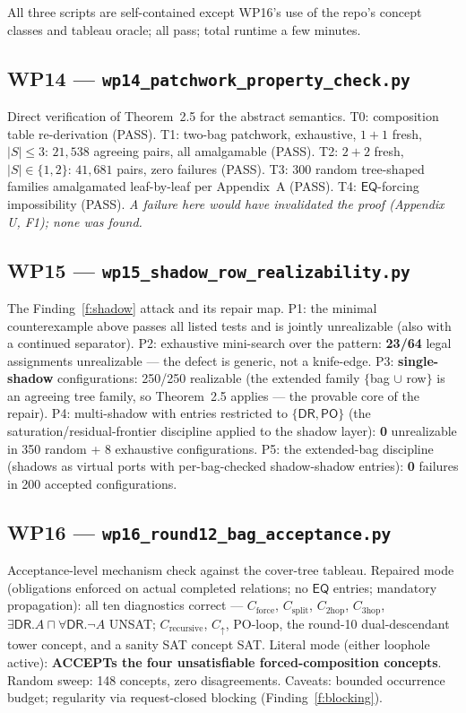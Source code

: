 \documentclass[11pt]{article}
\theoremstyle{definition}
\newcommand{\EQ}{\mathsf{EQ}}
\newcommand{\PO}{\mathsf{PO}}
\newcommand{\DR}{\mathsf{DR}}
\newcommand{\code}[1]{\texttt{#1}}
\begin{document}
All three scripts are self-contained except WP16's use of the repo's
concept classes and tableau oracle; all pass; total runtime a few minutes.

\subsection*{WP14 --- \code{wp14\_patchwork\_property\_check.py}}
Direct verification of Theorem~2.5 for the abstract semantics.
T0: composition table re-derivation (PASS).
T1: two-bag patchwork, exhaustive, $1{+}1$ fresh, $|S|\le 3$:
$21{,}538$ agreeing pairs, all amalgamable (PASS).
T2: $2{+}2$ fresh, $|S|\in\{1,2\}$: $41{,}681$ pairs, zero failures (PASS).
T3: 300 random tree-shaped families amalgamated leaf-by-leaf per
Appendix~A (PASS).
T4: $\EQ$-forcing impossibility (PASS).
\emph{A failure here would have invalidated the proof (Appendix U, F1);
none was found.}

\subsection*{WP15 --- \code{wp15\_shadow\_row\_realizability.py}}
The Finding~\ref{f:shadow} attack and its repair map.
P1: the minimal counterexample above passes all listed tests and is
jointly unrealizable (also with a continued separator).
P2: exhaustive mini-search over the pattern: \textbf{23/64} legal
assignments unrealizable --- the defect is generic, not a knife-edge.
P3: \textbf{single-shadow} configurations: 250/250 realizable (the
extended family $\{$bag $\cup$ row$\}$ is an agreeing tree family, so
Theorem~2.5 applies --- the provable core of the repair).
P4: multi-shadow with entries restricted to $\{\DR,\PO\}$ (the
saturation/residual-frontier discipline applied to the shadow layer):
\textbf{0} unrealizable in 350 random + 8 exhaustive configurations.
P5: the extended-bag discipline (shadows as virtual ports with
per-bag-checked shadow-shadow entries): \textbf{0} failures in 200
accepted configurations.

\subsection*{WP16 --- \code{wp16\_round12\_bag\_acceptance.py}}
Acceptance-level mechanism check against the cover-tree tableau.
Repaired mode (obligations enforced on actual completed relations; no
$\EQ$ entries; mandatory propagation): all ten diagnostics correct ---
$C_{\mathrm{force}}$, $C_{\mathrm{split}}$, $C_{\mathrm{2hop}}$,
$C_{\mathrm{3hop}}$, $\exists\DR.A\sqcap\forall\DR.\lnot A$ UNSAT;
$C_{\mathrm{recursive}}$, $C_\uparrow$, PO-loop, the round-10
dual-descendant tower concept, and a sanity SAT concept SAT.
Literal mode (either loophole active): \textbf{ACCEPTs the four
unsatisfiable forced-composition concepts}.  Random sweep: 148 concepts,
zero disagreements.  Caveats: bounded occurrence budget; regularity via
request-closed blocking (Finding~\ref{f:blocking}).
\end{document}
